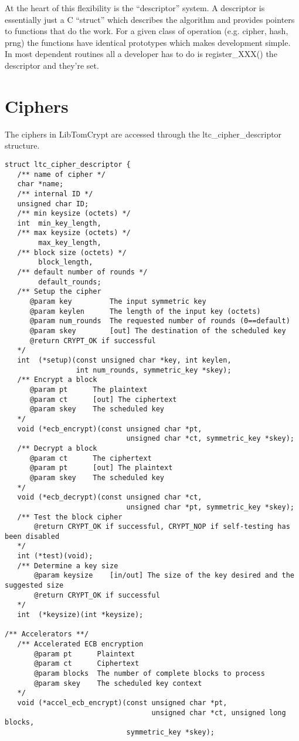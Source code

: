 \documentclass[a4paper]{book}
\begin{document}
At the heart of this flexibility is the ``descriptor'' system.  A descriptor is essentially just a C ``struct'' which describes the algorithm and provides pointers
to functions that do the work.  For a given class of operation (e.g. cipher, hash, prng) the functions have identical prototypes which makes development simple.  In most
dependent routines all a developer has to do is register\_XXX() the descriptor and they're set.

\section{Ciphers}
The ciphers in LibTomCrypt are accessed through the ltc\_cipher\_descriptor structure.

\begin{small}
\begin{verbatim}
struct ltc_cipher_descriptor {
   /** name of cipher */
   char *name;
   /** internal ID */
   unsigned char ID;
   /** min keysize (octets) */
   int  min_key_length, 
   /** max keysize (octets) */
        max_key_length, 
   /** block size (octets) */
        block_length, 
   /** default number of rounds */
        default_rounds;
   /** Setup the cipher 
      @param key         The input symmetric key
      @param keylen      The length of the input key (octets)
      @param num_rounds  The requested number of rounds (0==default)
      @param skey        [out] The destination of the scheduled key
      @return CRYPT_OK if successful
   */
   int  (*setup)(const unsigned char *key, int keylen, 
                 int num_rounds, symmetric_key *skey);
   /** Encrypt a block
      @param pt      The plaintext
      @param ct      [out] The ciphertext
      @param skey    The scheduled key
   */
   void (*ecb_encrypt)(const unsigned char *pt, 
                             unsigned char *ct, symmetric_key *skey);
   /** Decrypt a block
      @param ct      The ciphertext
      @param pt      [out] The plaintext
      @param skey    The scheduled key
   */
   void (*ecb_decrypt)(const unsigned char *ct, 
                             unsigned char *pt, symmetric_key *skey);
   /** Test the block cipher
       @return CRYPT_OK if successful, CRYPT_NOP if self-testing has been disabled
   */
   int (*test)(void);
   /** Determine a key size
       @param keysize    [in/out] The size of the key desired and the suggested size
       @return CRYPT_OK if successful
   */
   int  (*keysize)(int *keysize);

/** Accelerators **/
   /** Accelerated ECB encryption 
       @param pt      Plaintext
       @param ct      Ciphertext
       @param blocks  The number of complete blocks to process
       @param skey    The scheduled key context
   */
   void (*accel_ecb_encrypt)(const unsigned char *pt, 
                                   unsigned char *ct, unsigned long blocks, 
                             symmetric_key *skey);


\end{verbatim}
\end{small}
\end{document}
